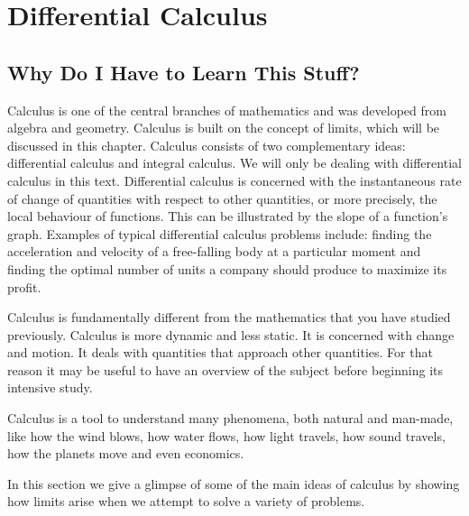 \chapter{Differential Calculus}
\label{m:fg:diff12}

\section{Why Do I Have to Learn This Stuff?}
Calculus is one of the central branches of mathematics and was developed from algebra and geometry. Calculus is built on the concept of limits, which will be discussed in this chapter. Calculus consists of two complementary ideas: differential calculus and integral calculus. We will only be dealing with differential calculus in this text. Differential calculus is concerned with the instantaneous rate of change of quantities with respect to other quantities, or more precisely, the local behaviour of functions. This can be illustrated by the slope of a function's graph. Examples of typical differential calculus problems include: finding the acceleration and velocity of a free-falling body at a particular moment and finding the optimal number of units a company should produce to maximize its profit.

Calculus is fundamentally different from the mathematics that you have studied previously. Calculus is more dynamic and less static. It is concerned with change and motion. It deals with quantities that approach other quantities. For that reason it may be useful to have an overview of the subject before beginning its intensive study. 

Calculus is a tool to understand many phenomena, both natural and man-made, like how the wind blows, how water flows, how light travels, how sound travels, how the planets move and even economics.

In this section we give a glimpse of some of the main ideas of calculus by showing how limits arise when we attempt to solve a variety of problems.


